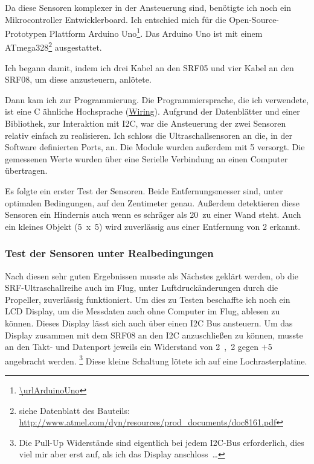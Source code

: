 Da diese Sensoren komplexer in der Ansteuerung sind,
benötigte ich noch ein Mikrocontroller Entwicklerboard.
Ich entschied mich für die Open-Source-Prototypen Plattform
Arduino Uno\footnote{\url{\urlArduinoUno}}.
Das Arduino Uno ist mit einem ATmega328\footnote{siehe Datenblatt des Bauteils:
\url{http://www.atmel.com/dyn/resources/prod_documents/doc8161.pdf}}
ausgestattet.

Ich begann damit, indem ich drei Kabel an den SRF05
und vier Kabel an den SRF08, um diese anzusteuern, anlötete.

Dann kam ich zur Programmierung.
Die Programmiersprache, die ich verwendete,
ist eine C ähnliche Hochsprache
(\href{http://wiring.org.co/}{Wiring}).
Aufgrund der Datenblätter und einer Bibliothek,
zur Interaktion mit \ac{I2C}, war die Ansteuerung
der zwei Sensoren relativ einfach zu realisieren.
Ich schloss die Ultraschallsensoren an
die, in der Software definierten Ports, an.
Die Module wurden außerdem mit \unit{5}{\volt} versorgt.
Die gemessenen Werte wurden über eine Serielle Verbindung
an einen Computer übertragen.

Es folgte ein erster Test der Sensoren.
Beide Entfernungsmesser sind, unter optimalen Bedingungen,
auf den Zentimeter genau.
Außerdem detektieren diese Sensoren ein Hindernis auch
wenn es schräger als 20\textdegree\ zu einer Wand steht.
Auch ein kleines Objekt (\unit{5 x 5}{\centi\metre}) wird zuverlässig
aus einer Entfernung von \unit{2}{\metre} erkannt.

\subsubsection{Test der Sensoren unter Realbedingungen}
Nach diesen sehr guten Ergebnissen musste als Nächstes geklärt werden,
ob die SRF-Ultraschallreihe auch im Flug,
unter Luftdruckänderungen durch die Propeller,
zuverlässig funktioniert.
Um dies zu Testen beschaffte ich noch ein \ac{LCD} Display,
um die Messdaten auch ohne Computer im Flug,
ablesen zu können.
Dieses Display lässt sich auch über einen \ac{I2C}
Bus ansteuern.
Um das Display zusammen mit dem SRF08 an den \ac{I2C} anzuschließen
zu können, musste an den Takt- und Datenport jeweils ein Widerstand
von \unit{2,2}{\kilo\ohm} gegen $+$\unit{5}{\volt} angebracht werden.%
\footnote{Die Pull-Up Widerstände sind eigentlich bei jedem \ac{I2C}-Bus erforderlich,
dies viel mir aber erst auf, als ich das Display anschloss~\dots}
Diese kleine Schaltung lötete ich auf eine Lochrasterplatine.

